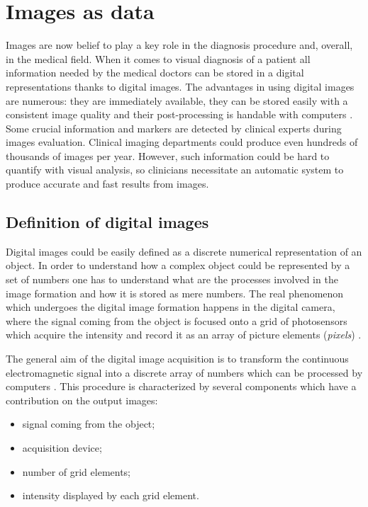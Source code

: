 \documentclass[../main.tex]{subfiles}
\begin{document}
\section{Images as data}
Images are now belief to play a key role in the diagnosis procedure and, overall, in the medical field. When it comes to visual diagnosis of a patient all information needed by the medical doctors can be stored in a digital representations thanks to digital images. 
The advantages in using digital images are numerous: they are immediately available, they can be stored easily with a consistent image quality and their post-processing is handable with computers \cite{journal_of_dermatology}.  
Some crucial information and markers are detected by clinical experts during images evaluation.
Clinical imaging departments could produce even hundreds of thousands of images per year\cite{info_in_images}. However, such information could be hard to quantify with visual analysis, so clinicians necessitate an automatic system to produce accurate and fast results from images.

\subsection{Definition of digital images}\label{sec:definition-of-images}

Digital images could be easily defined as a discrete numerical representation of an object. In order to understand how a complex object could be represented by a set of numbers one has to understand what are the processes involved in the image formation and how it is stored as mere numbers.
The real phenomenon which undergoes the digital image formation happens in the digital camera, where the signal coming from the object is focused onto a grid of photosensors which acquire the intensity and record it as an array of picture elements (\textit{pixels}) \cite{bourne2010fundamentals}.

The general aim of the digital image acquisition is to transform the continuous electromagnetic signal into a discrete array of numbers which can be processed by computers \cite{image_acquisition_article}. This procedure is characterized by several components which have a contribution on the output images:

\begin{itemize}
    \item signal coming from the object;
    \item acquisition device;
    \item number of grid elements;
    \item intensity displayed by each grid element.
\end{itemize}
\end{document}
